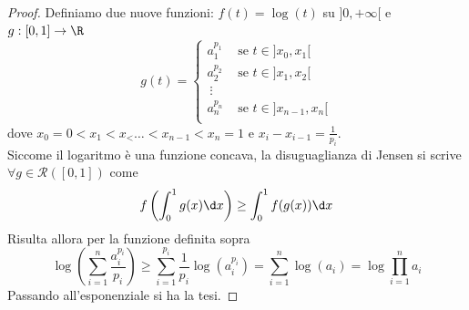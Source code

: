 \documentclass{article}
\newcommand{\se}{\text{ se }}
\begin{document}
\begin{enumerate}[label=\textbf{Esercizio 12.\arabic*.},itemindent=*]
\begin{proof}
    Definiamo due nuove funzioni: $f(t)=\log(t)$ su $]0,+\infty[$ e $g:[0,1]\to \R$ 
    \[g(t)=\begin{cases}
        a_1^{p_1} &\se t \in ]x_0, x_1[\\
        a_2^{p_2} &\se t \in ]x_1, x_2[\\
        \:\vdots\\
        a_n^{p_n} &\se t \in ]x_{n-1}, x_n[\\
    \end{cases}\]
    dove $x_0=0<x_1<x_<\dots<x_{n-1}<x_n=1$ e $x_i-x_{i-1}=\frac{1}{p_i}$.\\
    Siccome il logaritmo è una funzione concava, la disuguaglianza di Jensen si scrive $\forall g\in \mathcal{R}([0,1])$ come 
    \[f\left( \int_0^1 g(x)\d x\right)\geq\int_0^1f(g(x))\d x\]
    Risulta allora per la funzione definita sopra
    \[\log\left( \sum_{i=1}^n\frac{a_i^{p_i}}{p_i} \right)\geq \sum_{i=1}^{p_i}\frac{1}{p_i}\log(a_i^{p_i})=\sum_{i=1}^n\log(a_i)=\log{\prod_{i=1}^n}a_i\]
    Passando all'esponenziale si ha la tesi.
\end{proof}
\end{enumerate}
\end{document}
